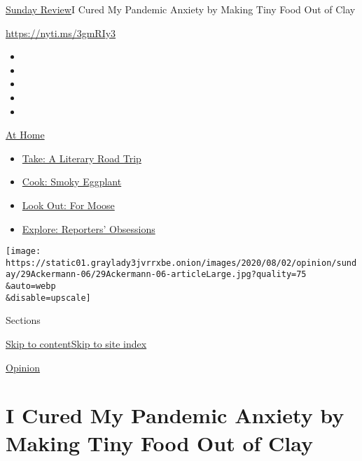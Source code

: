 \href{/section/opinion/sunday}{Sunday Review}\textbar{}I Cured My
Pandemic Anxiety by Making Tiny Food Out of Clay

\url{https://nyti.ms/3gmRIy3}

\begin{itemize}
\item
\item
\item
\item
\item
\end{itemize}

\href{https://www.nytimes3xbfgragh.onion/spotlight/at-home?action=click\&pgtype=Article\&state=default\&region=TOP_BANNER\&context=at_home_menu}{At
Home}

\begin{itemize}
\tightlist
\item
  \href{https://www.nytimes3xbfgragh.onion/2020/07/28/books/time-for-a-literary-road-trip.html?action=click\&pgtype=Article\&state=default\&region=TOP_BANNER\&context=at_home_menu}{Take:
  A Literary Road Trip}
\item
  \href{https://www.nytimes3xbfgragh.onion/2020/07/29/magazine/bored-with-your-home-cooking-some-smoky-eggplant-will-fix-that.html?action=click\&pgtype=Article\&state=default\&region=TOP_BANNER\&context=at_home_menu}{Cook:
  Smoky Eggplant}
\item
  \href{https://www.nytimes3xbfgragh.onion/2020/07/27/travel/moose-michigan-isle-royale.html?action=click\&pgtype=Article\&state=default\&region=TOP_BANNER\&context=at_home_menu}{Look
  Out: For Moose}
\item
  \href{https://www.nytimes3xbfgragh.onion/interactive/2020/at-home/even-more-reporters-editors-diaries-lists-recommendations.html?action=click\&pgtype=Article\&state=default\&region=TOP_BANNER\&context=at_home_menu}{Explore:
  Reporters' Obsessions}
\end{itemize}

\texttt{[image: https://static01.graylady3jvrrxbe.onion/images/2020/08/02/opinion/sunday/29Ackermann-06/29Ackermann-06-articleLarge.jpg?quality=75\\\&auto=webp\\\&disable=upscale]}

Sections

\protect\hyperlink{site-content}{Skip to
content}\protect\hyperlink{site-index}{Skip to site index}

\href{/section/opinion}{Opinion}

\hypertarget{i-cured-my-pandemic-anxiety-by-making-tiny-food-out-of-clay}{%
\section{I Cured My Pandemic Anxiety by Making Tiny Food Out of
Clay}\label{i-cured-my-pandemic-anxiety-by-making-tiny-food-out-of-clay}}

